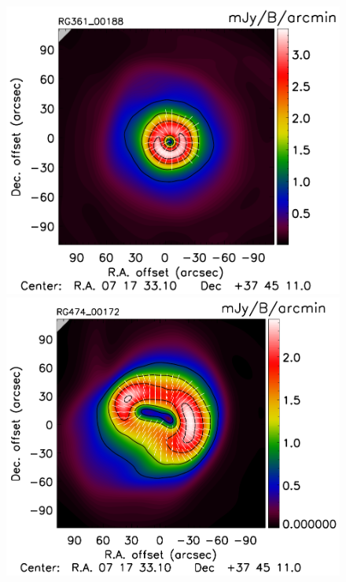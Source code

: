 \documentclass[twocolumn,traditabstract]{aa}
\begin{document}
\begin{figure}[h]
\includegraphics[trim=0cm 0.7cm 0cm 0cm, clip=true, totalheight=3.6cm]{Figure/Grad_RG361_00188_Ymap_zobs0p6_regrid_15_15_45.pdf}
\includegraphics[trim=0cm 0.7cm 0cm 0cm, clip=true, totalheight=3.6cm]{Figure/Grad_RG474_00172_Ymap_zobs0p9_regrid_15_15_45.pdf}

\end{figure}
\end{document}
